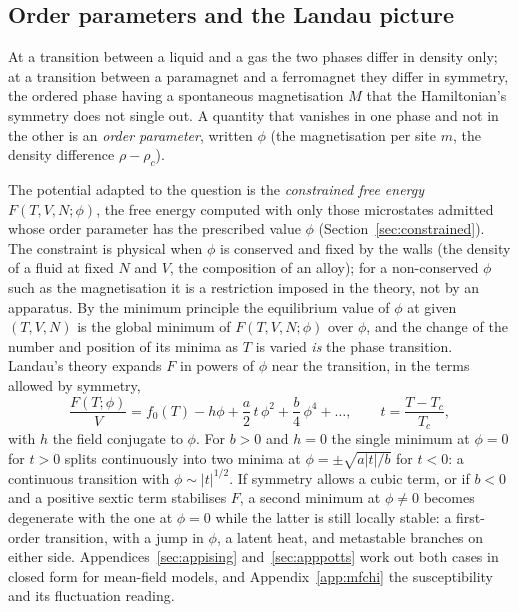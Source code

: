 \documentclass[10pt,a4paper]{article}
\theoremstyle{remark}
\begin{document}
\subsection{Order parameters and the Landau picture}
\label{sec:landau}

At a transition between a liquid and a gas the two phases differ in density
only; at a transition between a paramagnet and a ferromagnet they differ in
symmetry, the ordered phase having a spontaneous magnetisation $M$ that the
Hamiltonian's symmetry does not single out. A quantity that vanishes in one
phase and not in the other is an \emph{order parameter}, written $\phi$ (the
magnetisation per site $m$, the density difference $\rho-\rho_c$).

The potential adapted to the question is the \emph{constrained free energy}
$F(T,V,N;\phi)$, the free energy computed with only those microstates
admitted whose order parameter has the prescribed value $\phi$
(Section~\ref{sec:constrained}). The constraint is physical when $\phi$ is
conserved and fixed by the walls (the density of a fluid at fixed $N$ and $V$,
the composition of an alloy); for a non-conserved $\phi$ such as the
magnetisation it is a restriction imposed in the theory, not by an apparatus. By the minimum principle the equilibrium
value of $\phi$ at given $(T,V,N)$ is the global minimum of
$F(T,V,N;\phi)$ over $\phi$, and the change of the number and position of its
minima as $T$ is varied \emph{is} the phase transition. Landau's theory expands
$F$ in powers of $\phi$ near the transition, in the terms allowed by symmetry,
\[
  \frac{F(T;\phi)}{V}=f_0(T)-h\phi+\frac{a}{2}\,t\,\phi^{2}+\frac{b}{4}\,\phi^{4}+\dots ,
  \qquad t=\frac{T-T_c}{T_c} ,
\]
with $h$ the field conjugate to $\phi$. For $b>0$ and $h=0$ the single minimum
at $\phi=0$ for $t>0$ splits continuously into two minima at
$\phi=\pm\sqrt{a|t|/b}$ for $t<0$: a continuous transition with
$\phi\sim|t|^{1/2}$. If symmetry allows a cubic term, or if $b<0$ and a
positive sextic term stabilises $F$, a second minimum at $\phi\neq0$ becomes
degenerate with the one at $\phi=0$ while the latter is still locally stable:
a first-order transition, with a jump in $\phi$, a latent heat, and metastable
branches on either side. Appendices~\ref{sec:appising} and~\ref{sec:apppotts}
work out both cases in closed form for mean-field models, and
Appendix~\ref{app:mfchi} the susceptibility and its fluctuation reading.
\end{document}
